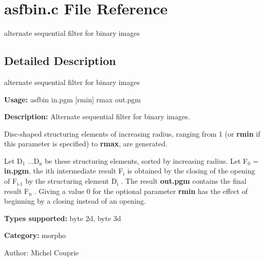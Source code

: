 \section{asfbin.c File Reference}
\label{asfbin_8c}
alternate sequential filter for binary images  




\label{_details}
\subsection{Detailed Description}
alternate sequential filter for binary images 

{\bf Usage:} asfbin in.pgm [rmin] rmax out.pgm

{\bf Description:} Alternate sequential filter for binary images.

Disc-shaped structuring elements of increasing radius, ranging from 1 (or {\bf rmin} if this parameter is specified) to {\bf rmax}, are generated.

Let D$_{\mbox{1}}$ ...D$_{\mbox{n}}$  be these structuring elements, sorted by increasing radius. Let F$_{\mbox{0}}$  = {\bf in.pgm}, the ith intermediate result F$_{\mbox{i}}$  is obtained by the closing of the opening of F$_{\mbox{i-1}}$  by the structuring element D$_{\mbox{i}}$ . The result {\bf out.pgm} contains the final result F$_{\mbox{n}}$ . Giving a value 0 for the optional parameter {\bf rmin} has the effect of beginning by a closing instead of an opening.

{\bf Types supported:} byte 2d, byte 3d

{\bf Category:} morpho

\begin{Desc}
\item[Author:]Michel Couprie \end{Desc}
